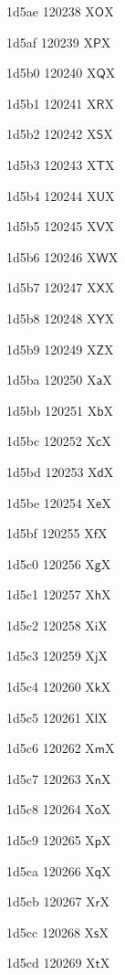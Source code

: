 \documentclass[11pt]{article}
\begin{document}
1d5ae 120238 X{\ensuremath{\mathsf{O}}}X

1d5af 120239 X{\ensuremath{\mathsf{P}}}X

1d5b0 120240 X{\ensuremath{\mathsf{Q}}}X

1d5b1 120241 X{\ensuremath{\mathsf{R}}}X

1d5b2 120242 X{\ensuremath{\mathsf{S}}}X

1d5b3 120243 X{\ensuremath{\mathsf{T}}}X

1d5b4 120244 X{\ensuremath{\mathsf{U}}}X

1d5b5 120245 X{\ensuremath{\mathsf{V}}}X

1d5b6 120246 X{\ensuremath{\mathsf{W}}}X

1d5b7 120247 X{\ensuremath{\mathsf{X}}}X

1d5b8 120248 X{\ensuremath{\mathsf{Y}}}X

1d5b9 120249 X{\ensuremath{\mathsf{Z}}}X

1d5ba 120250 X{\ensuremath{\mathsf{a}}}X

1d5bb 120251 X{\ensuremath{\mathsf{b}}}X

1d5bc 120252 X{\ensuremath{\mathsf{c}}}X

1d5bd 120253 X{\ensuremath{\mathsf{d}}}X

1d5be 120254 X{\ensuremath{\mathsf{e}}}X

1d5bf 120255 X{\ensuremath{\mathsf{f}}}X

1d5c0 120256 X{\ensuremath{\mathsf{g}}}X

1d5c1 120257 X{\ensuremath{\mathsf{h}}}X

1d5c2 120258 X{\ensuremath{\mathsf{i}}}X

1d5c3 120259 X{\ensuremath{\mathsf{j}}}X

1d5c4 120260 X{\ensuremath{\mathsf{k}}}X

1d5c5 120261 X{\ensuremath{\mathsf{l}}}X

1d5c6 120262 X{\ensuremath{\mathsf{m}}}X

1d5c7 120263 X{\ensuremath{\mathsf{n}}}X

1d5c8 120264 X{\ensuremath{\mathsf{o}}}X

1d5c9 120265 X{\ensuremath{\mathsf{p}}}X

1d5ca 120266 X{\ensuremath{\mathsf{q}}}X

1d5cb 120267 X{\ensuremath{\mathsf{r}}}X

1d5cc 120268 X{\ensuremath{\mathsf{s}}}X

1d5cd 120269 X{\ensuremath{\mathsf{t}}}X
\end{document}
